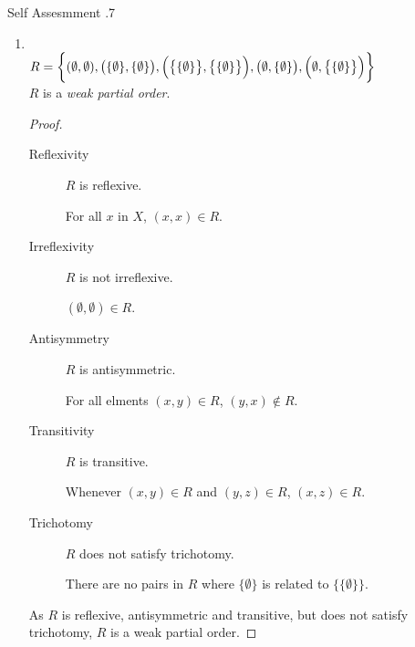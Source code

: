 \documentclass[../notes.tex]{subfiles}
\begin{document}
\begin{exercise}{Self Assesmment \thechapter.7}
\begin{enumerate}
\begin{enumerate}[label=(\alph*)]
								\tcbbreak
								\item {}\\
									$R = \biggl\{(\emptyset, \emptyset), \bigl(\{\emptyset\}, \{\emptyset\}\bigr), \Bigl(\bigl\{\{\emptyset \}\bigr\}, \bigl\{\{\emptyset\}\bigr\}\Bigr), \bigl(\emptyset, \{\emptyset\}\bigr), \Bigl(\emptyset, \bigl\{\{\emptyset\}\bigr\}\Bigr)\biggr\}$\\
									$R$ is a \emph{weak partial order}.
									\begin{proof}
										$ $
										\begin{description}
											\item[Reflexivity] $R$ is reflexive.
												\begin{subproof}
													For all $x$ in $X$, $(x, x) \in R$.
												\end{subproof}
											\item[Irreflexivity] $R$ is not irreflexive.
												\begin{subproof}[Counterexample]
													$(\emptyset, \emptyset) \in R$.
												\end{subproof}
											\item[Antisymmetry] $R$ is antisymmetric.
												\begin{subproof}
													For all elments $(x, y) \in R$, $(y, x) \notin R$.
												\end{subproof}
											\item[Transitivity] $R$ is transitive.
												\begin{subproof}
													Whenever $(x, y) \in R$ and $(y, z) \in R$, $(x, z) \in R$.
												\end{subproof}
											\item[Trichotomy] $R$ does not satisfy trichotomy.
												\begin{subproof}[Counterexample]
													There are no pairs in $R$ where $\{\emptyset\}$ is related to $\bigl\{\{\emptyset\}\bigr\}$.
												\end{subproof}
										\end{description}
										As $R$ is reflexive, antisymmetric and transitive, but does not satisfy trichotomy, $R$ is a weak partial order.
									\end{proof}
							\end{enumerate}

\end{enumerate}
\end{exercise}
\end{document}
